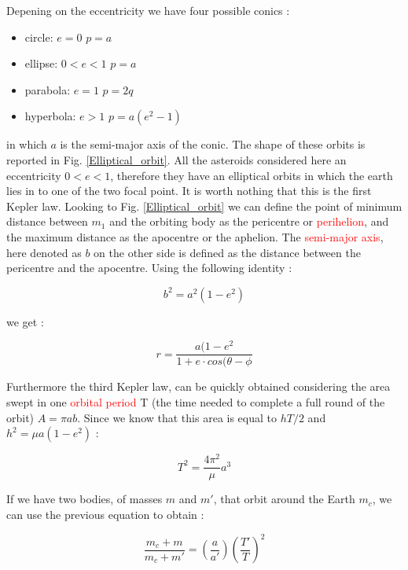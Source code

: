 \documentclass[12pt,%
               a4paper,%
               oneside,openany,%
               titlepage,%
               headinclude,footinclude,%
               BCOR5mm,%
               cleardoublepage=empty,%
               tablecaptionabove,%
               floatperchapter,
               ]{scrreprt}                 %
\begin{document}
Depening on the eccentricity we have four possible conics \cite{murray1999solar}:

\begin{itemize}
\item circle:  $e=0$ \quad $p=a$
\item ellipse: $0<e<1$ \quad $p=a$
\item parabola: $e=1$ \quad $p=2q$
\item hyperbola: $e>1$ \quad $p=a(e^{2}-1)$
\end{itemize}

in which $a$ is the semi-major axis of the conic. The shape of these orbits is reported in Fig. \ref{Elliptical_orbit}. All the asteroids considered here an eccentricity $0<e<1$, therefore they have an elliptical orbits in which the earth lies in to one of the two focal point. It is worth nothing that this is the first Kepler law.  Looking to Fig. \ref{Elliptical_orbit} we can define the point of minimum distance between $m_{1}$ and the orbiting body as the pericentre or \textcolor{red}{perihelion}, and the maximum distance as the apocentre or the aphelion. The \textcolor{red}{semi-major axis}, here denoted as $b$ on the other side is defined as the distance between the pericentre and the apocentre. Using the following identity \cite{murray1999solar}:

\begin{equation}
b^{2}=a^{2}(1-e^{2})
\end{equation}

we get \cite{murray1999solar}:

\begin{equation}
r=\frac{a(1-e^{2}}{1+e\cdot cos(\theta-\phi}
\label{eq-mot}
\end{equation}

Furthermore the third Kepler law, can be quickly obtained considering the area swept in one \textcolor{red}{orbital period} T (the time needed to complete a full round of the orbit) $A=\pi ab$. Since we know that this area is equal to $hT/2$ and $h^{2}=\mu a(1-e^{2})$ \cite{murray1999solar}:

\begin{equation}
T^{2}=\dfrac{4\pi^{2}}{\mu}a^{3}
\end{equation}

If we have two bodies, of masses $m$ and $m'$, that orbit around the Earth $m_{c}$, we can use the previous equation to obtain \cite{murray1999solar}:

\begin{equation}
\frac{m_{c}+m}{m_{c}+m'}=\left(\frac{a}{a'}\right)\left(\frac{T'}{T}\right)^{2}
\end{equation}
\end{document}
